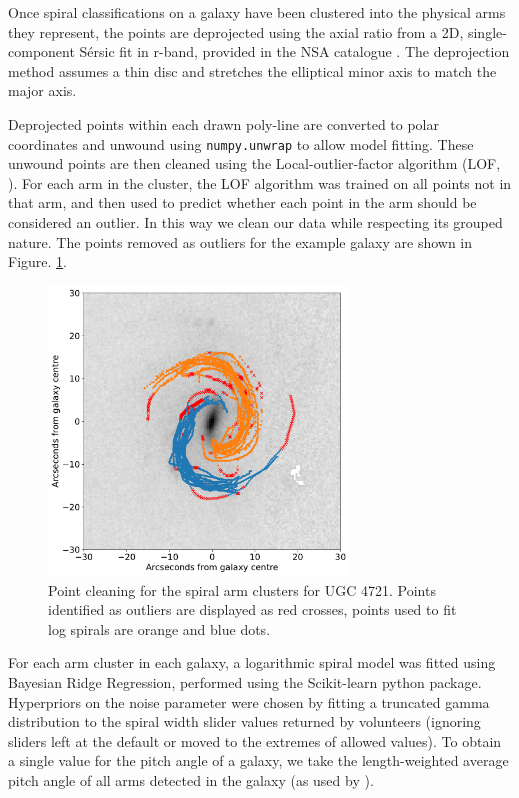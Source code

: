 \documentclass[../main.tex]{subfiles}
\begin{document}
Once spiral classifications on a galaxy have been clustered into the physical arms they represent, the points are deprojected using the axial ratio from a 2D, single-component S\'ersic fit in r-band, provided in the NSA catalogue \citep{2011AJ....142...31B}. The deprojection method assumes a thin disc and stretches the elliptical minor axis to match the major axis.

Deprojected points within each drawn poly-line are converted to polar coordinates and unwound using \texttt{numpy.unwrap} to allow model fitting. These unwound points are then cleaned using the Local-outlier-factor algorithm (LOF, \citealt{local-outlier-factor}). For each arm in the cluster, the LOF algorithm was trained on all points not in that arm, and then used to predict whether each point in the arm should be considered an outlier. In this way we clean our data while respecting its grouped nature. The points removed as outliers for the example galaxy are shown in Figure. \ref{fig:LOF_cleaning}.

\begin{figure}
  \includegraphics[width=8cm]{images__method/LOF_cleaning.pdf}
  \caption{Point cleaning for the spiral arm clusters for UGC 4721. Points identified as outliers are displayed as red crosses, points used to fit log spirals are orange and blue dots.}
  \label{fig:LOF_cleaning}
\end{figure}

For each arm cluster in each galaxy, a logarithmic spiral model was fitted using Bayesian Ridge Regression, performed using the Scikit-learn python package. Hyperpriors on the noise parameter were chosen by fitting a truncated gamma distribution \citep{2014arXiv1401.0287Z} to the spiral width slider values returned by volunteers (ignoring sliders left at the default or moved to the extremes of allowed values). To obtain a single value for the pitch angle of a galaxy, we take the length-weighted average pitch angle of all arms detected in the galaxy (as used by \citealt{Davis2014:1402.1910v1}).
\end{document}
